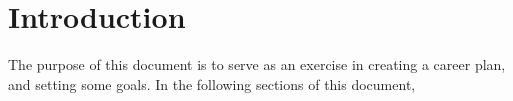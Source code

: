 \section{Introduction}

The purpose of this document is to serve as an exercise in creating a career plan, and setting some goals. In the following sections of this document, 
